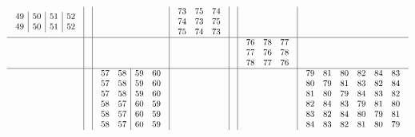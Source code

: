 \documentclass[12pt,a4paper,landscape]{amsart}
\begin{document}
\begin{align*}
\begin{array}{c|c|c|c|c|c|c}
\begin{array}{r|r|r|r}
49&50&51&52\\%
49&50&51&52\\%
\end{array}%
&&&
\begin{array}{rrr}%
73&75&74\\%
74&73&75\\%
75&74&73\\%
\end{array}%
&&\\\hline
&&&&&
\begin{array}{rrr}%
76&78&77\\%
77&76&78\\%
78&77&76\\%
\end{array}%
&\\\hline
&&
\begin{array}{rr|rr}%
57&58&59&60\\%
57&58&59&60\\%
57&58&59&60\\%
58&57&60&59\\%
58&57&60&59\\%
58&57&60&59\\%
\end{array}%
&&&&
\begin{array}{rrrrrr}%
79&81&80&82&84&83\\%
80&79&81&83&82&84\\%
81&80&79&84&83&82\\%
82&84&83&79&81&80\\%
83&82&84&80&79&81\\%
84&83&82&81&80&79\\%
\end{array}%
\end{array}
\end{align*}
\end{document}
